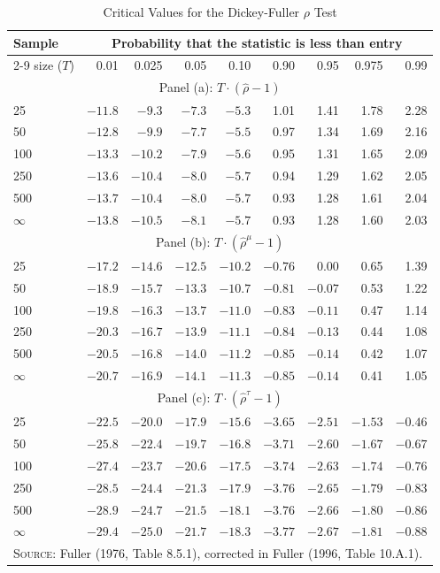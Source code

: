 \begin{table}[htbp]
\centering
\caption{Critical Values for the Dickey-Fuller $\rho$ Test}
\label{tab:9.1}
\small
\begin{tabular}{l*{8}{r}}
\toprule
Sample & \multicolumn{8}{c}{Probability that the statistic is less than entry} \\
\cmidrule(l){2-9}
size ($T$) & 0.01 & 0.025 & 0.05 & 0.10 & 0.90 & 0.95 & 0.975 & 0.99 \\
\midrule
\multicolumn{9}{c}{Panel (a): $T \cdot (\hat{\rho} - 1)$} \\
\midrule
25   & $-11.8$ & $-9.3$ & $-7.3$ & $-5.3$ & 1.01 & 1.41 & 1.78 & 2.28 \\
50   & $-12.8$ & $-9.9$ & $-7.7$ & $-5.5$ & 0.97 & 1.34 & 1.69 & 2.16 \\
100  & $-13.3$ & $-10.2$ & $-7.9$ & $-5.6$ & 0.95 & 1.31 & 1.65 & 2.09 \\
250  & $-13.6$ & $-10.4$ & $-8.0$ & $-5.7$ & 0.94 & 1.29 & 1.62 & 2.05 \\
500  & $-13.7$ & $-10.4$ & $-8.0$ & $-5.7$ & 0.93 & 1.28 & 1.61 & 2.04 \\
$\infty$ & $-13.8$ & $-10.5$ & $-8.1$ & $-5.7$ & 0.93 & 1.28 & 1.60 & 2.03 \\
\midrule
\multicolumn{9}{c}{Panel (b): $T \cdot (\hat{\rho}^\mu - 1)$} \\
\midrule
25   & $-17.2$ & $-14.6$ & $-12.5$ & $-10.2$ & $-0.76$ & 0.00 & 0.65 & 1.39 \\
50   & $-18.9$ & $-15.7$ & $-13.3$ & $-10.7$ & $-0.81$ & $-0.07$ & 0.53 & 1.22 \\
100  & $-19.8$ & $-16.3$ & $-13.7$ & $-11.0$ & $-0.83$ & $-0.11$ & 0.47 & 1.14 \\
250  & $-20.3$ & $-16.7$ & $-13.9$ & $-11.1$ & $-0.84$ & $-0.13$ & 0.44 & 1.08 \\
500  & $-20.5$ & $-16.8$ & $-14.0$ & $-11.2$ & $-0.85$ & $-0.14$ & 0.42 & 1.07 \\
$\infty$ & $-20.7$ & $-16.9$ & $-14.1$ & $-11.3$ & $-0.85$ & $-0.14$ & 0.41 & 1.05 \\
\midrule
\multicolumn{9}{c}{Panel (c): $T \cdot (\hat{\rho}^\tau - 1)$} \\
\midrule
25   & $-22.5$ & $-20.0$ & $-17.9$ & $-15.6$ & $-3.65$ & $-2.51$ & $-1.53$ & $-0.46$ \\
50   & $-25.8$ & $-22.4$ & $-19.7$ & $-16.8$ & $-3.71$ & $-2.60$ & $-1.67$ & $-0.67$ \\
100  & $-27.4$ & $-23.7$ & $-20.6$ & $-17.5$ & $-3.74$ & $-2.63$ & $-1.74$ & $-0.76$ \\
250  & $-28.5$ & $-24.4$ & $-21.3$ & $-17.9$ & $-3.76$ & $-2.65$ & $-1.79$ & $-0.83$ \\
500  & $-28.9$ & $-24.7$ & $-21.5$ & $-18.1$ & $-3.76$ & $-2.66$ & $-1.80$ & $-0.86$ \\
$\infty$ & $-29.4$ & $-25.0$ & $-21.7$ & $-18.3$ & $-3.77$ & $-2.67$ & $-1.81$ & $-0.88$ \\
\bottomrule
\multicolumn{9}{l}{\footnotesize\textsc{Source}: Fuller (1976, Table 8.5.1), corrected in Fuller (1996, Table 10.A.1).}
\end{tabular}
\end{table}

